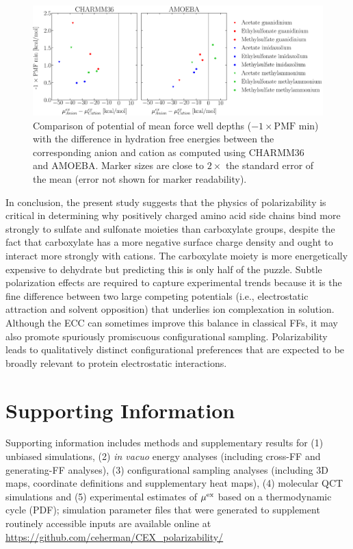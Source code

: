 \documentclass[journal=jpclcd,manuscript=article,articletitle=true,layout=twocolumn]{achemso}
\begin{document}
\begin{figure}[ht]
    \begin{center}
        \includegraphics[width=\textwidth]{final_images/Figure5.eps}
        \caption{Comparison of potential of mean force well depths ($-1 \times \text{PMF min}$) with the difference in hydration free energies between the corresponding anion and cation as computed using CHARMM36 and AMOEBA. Marker sizes are close to $2\times$ the standard error of the mean (error not shown for marker readability).}
        \label{fig:volcano}
    \end{center}
\end{figure}

In conclusion, the present study suggests that the physics of polarizability is critical in determining why positively charged amino acid side chains bind more strongly to sulfate and sulfonate moieties than carboxylate groups, despite the fact that carboxylate has a more negative surface charge density and ought to interact more strongly with cations. The carboxylate moiety is more energetically expensive to dehydrate but predicting this is only half of the puzzle. Subtle polarization effects are required to capture experimental trends because it is the fine difference between two large competing potentials (i.e., electrostatic attraction and solvent opposition) that underlies ion complexation in solution. Although the ECC can sometimes improve this balance in classical FFs, it may also promote spuriously promiscuous configurational sampling. Polarizability leads to qualitatively distinct configurational preferences that are expected to be broadly relevant to protein electrostatic interactions.



\section{Supporting Information} 
    Supporting information includes methods and supplementary results for (1) unbiased simulations, (2) \emph{in vacuo} energy analyses (including cross-FF and generating-FF analyses), (3) configurational sampling analyses (including 3D maps, coordinate definitions and supplementary heat maps), (4) molecular QCT simulations and (5) experimental estimates of $\mu^{\rm{ex}}$ based on a thermodynamic cycle (PDF); simulation parameter files that were generated to supplement routinely accessible inputs are available online at \url{https://github.com/ceherman/CEX_polarizability/}
\end{document}
